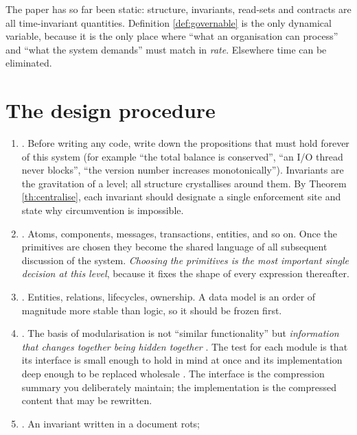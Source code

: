 \begin{remark}\label{rmk:only-dynamics}
The paper has so far been static: structure, invariants, read-sets and contracts are all
time-invariant quantities. Definition \ref{def:governable} is the only dynamical variable,
because it is the only place where ``what an organisation can process'' and ``what the
system demands'' must match in \emph{rate}. Elsewhere time can be eliminated.
\end{remark}

\section{The design procedure}\label{sec:seven-steps}

\begin{enumerate}[label=(D\arabic*)]
\item {}. Before writing any code, write down the propositions
      that must hold forever of this system (for example ``the total balance is
      conserved'', ``an I/O thread never blocks'', ``the version number increases
      monotonically''). Invariants are the gravitation of a level; all structure
      crystallises around them. By Theorem \ref{th:centralise}, each invariant should
      designate a single enforcement site and state why circumvention is impossible.
\item {}. Atoms, components, messages, transactions, entities,
      and so on. Once the primitives are chosen they become the shared language of all
      subsequent discussion of the system. \emph{Choosing the primitives is the most
      important single decision at this level}, because it fixes the shape of every
      expression thereafter.
\item {}. Entities, relations, lifecycles, ownership. A data model
      is an order of magnitude more stable than logic, so it should be frozen first.
\item {}. The basis of modularisation is not ``similar
      functionality'' but \emph{information that changes together being hidden together}
      \cite{parnas1972}. The test for each module is that its interface is small enough to
      hold in mind at once and its implementation deep enough to be replaced wholesale
      \cite{ousterhout2018}. The interface is the compression summary you deliberately
      maintain; the implementation is the compressed content that may be rewritten.
\item {}. An invariant written in a document rots;

\end{enumerate}
